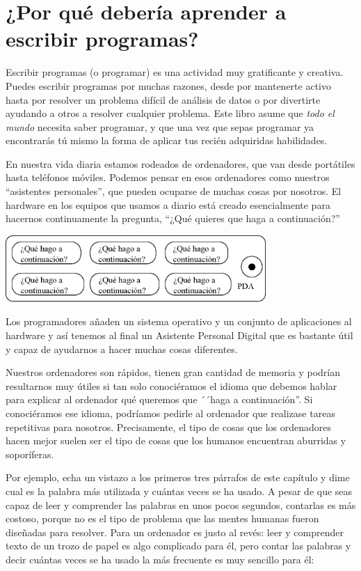 
\chapter{¿Por qué debería aprender a escribir programas?}

Escribir programas (o programar) es una actividad muy
gratificante y creativa. Puedes escribir programas por
muchas razones, desde por mantenerte activo hasta
por resolver un problema difícil de análisis de datos o
por divertirte ayudando a otros a resolver cualquier problema.
Este libro asume que \emph{todo el mundo} necesita saber programar,
y que una vez que sepas programar ya encontrarás tú mismo
la forma de aplicar tus recién adquiridas habilidades.

En nuestra vida diaria estamos rodeados de ordenadores, que van
desde portátiles hasta teléfonos móviles. Podemos pensar en esos
ordenadores como nuestros ``asistentes personales'', que pueden
ocuparse de muchas cosas por nosotros. El hardware en los equipos
que usamos a diario está creado esencialmente para hacernos
continuamente la pregunta,
``¿Qué quieres que haga a continuación?''

\beforefig
\centerline{\includegraphics[height=1.00in]{figs2/pda.eps}}
\afterfig

Los programadores añaden un sistema operativo y un conjunto de
aplicaciones al hardware y así tenemos al final un Asistente Personal
Digital que es bastante útil y capaz de ayudarnos a hacer
muchas cosas diferentes.

Nuestros ordenadores son rápidos, tienen gran cantidad de memoria
y podrían resultarnos muy útiles si tan solo conociéramos el idioma
que debemos hablar para explicar al ordenador qué queremos que
´´haga a continuación''. Si conociéramos ese idioma, podríamos pedirle al
ordenador que realizase tareas repetitivas para nosotros. 
Precisamente, el tipo de cosas que los ordenadores hacen mejor
suelen ser el tipo de cosas que los humanos encuentran aburridas
y soporíferas.

Por ejemplo, echa un vistazo a los primeros tres párrafos de este
capítulo y dime cual es la palabra más utilizada y cuántas veces
se ha usado. A pesar de que seas capaz de leer y comprender
las palabras en unos pocos segundos, contarlas es más costoso,
porque no es el tipo de problema que las mentes humanas
fueron diseñadas para resolver. Para un ordenador
es justo al revés: leer y comprender texto
de un trozo de papel es algo complicado para él,
pero contar las palabras y decir cuántas veces
se ha usado la más frecuente es muy sencillo para él:

